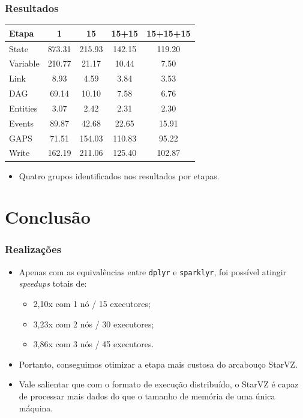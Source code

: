 \documentclass{beamer}
\begin{document}
\begin{frame}
 \frametitle{Resultados}
  \begin{table}[ht]
  \begin{tabular}{l c c c c} \toprule
  \textbf{Etapa}  & \textbf{1} & \textbf{15} & \textbf{15+15} & 
  \textbf{15+15+15}\\ 
  \midrule
  State		& 873.31 & 215.93 & 142.15 & 119.20\\
  Variable  	& 210.77 & 21.17  & 10.44  & 7.50 \\
  Link      	& 8.93   & 4.59   & 3.84   & 3.53 \\
  DAG        	& 69.14  & 10.10  & 7.58   & 6.76 \\
  Entities	& 3.07   & 2.42   & 2.31   & 2.30 \\
  Events		& 89.87  & 42.68  & 22.65  & 15.91\\
  GAPS		& 71.51  & 154.03 & 110.83 & 95.22\\
  Write		& 162.19 & 211.06 & 125.40 & 102.87\\
  \end{tabular}
  \end{table}
  \begin{itemize}
   \item Quatro grupos identificados nos resultados por etapas.
  \end{itemize}
\end{frame}



\section{Conclusão}

\begin{frame}
 \frametitle{Realizações}
 \begin{itemize}
  \item Apenas com as equivalências entre \texttt{dplyr} e \texttt{sparklyr}, 
foi possível atingir \emph{speedups} totais de:	
    \begin{itemize}
      \item 2,10x com 1 nó / 15 executores;
      \item 3,23x com 2 nós / 30 executores;
      \item 3,86x com 3 nós / 45 executores.
    \end{itemize}
  \item Portanto, conseguimos otimizar a etapa mais custosa do arcabouço StarVZ.
  \item Vale salientar que com o formato de execução distribuído, o StarVZ é 
capaz de processar mais dados do que o tamanho de memória de uma única máquina.
 \end{itemize}
\end{frame}
\end{document}
